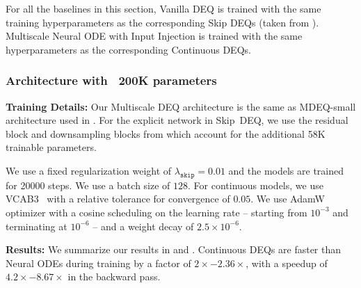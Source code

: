 For all the baselines in this section, Vanilla DEQ is trained with the same training hyperparameters as the corresponding Skip DEQs (taken from \citet{bai_multiscale_2020}). Multiscale Neural ODE with Input Injection is trained with the same hyperparameters as the corresponding Continuous DEQs.

\subsubsection{Architecture with ~200K parameters}

% 

\textbf{Training Details:} Our Multiscale DEQ architecture is the same as MDEQ-small architecture used in \citet{bai_multiscale_2020}. For the explicit network in Skip~DEQ, we use the residual block and downsampling blocks from \citet{bai_multiscale_2020} which account for the additional 58K trainable parameters.

We use a fixed regularization weight of $\lambda_{\texttt{skip}} = 0.01$ and the models are trained for 20000 steps. We use a batch size of $128$. For continuous models, we use VCAB3~\citep{wanner1996solving} with a relative tolerance for convergence of $0.05$. We use AdamW~\citep{loshchilov2017decoupled} optimizer with a cosine scheduling on the learning rate -- starting from $10^{-3}$ and terminating at $10^{-6}$ -- and a weight decay of $2.5 \times 10^{-6}$.

\textbf{Results:} We summarize our results in  and . Continuous DEQs are faster than Neural ODEs during training by a factor of $\mathit{2\times - 2.36\times}$, with a speedup of $\mathit{4.2\times - 8.67\times}$ in the backward pass.

